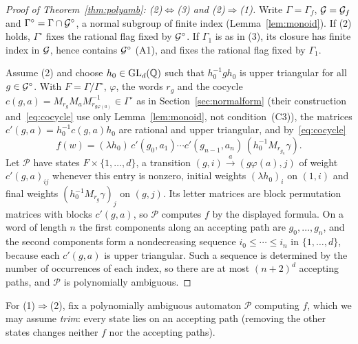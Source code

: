 \begin{proof}[Proof of Theorem~\ref{thm:polyamb}: (2)$\Leftrightarrow$(3) and (2)$\Rightarrow$(1)]
Write $\Gamma=\Gamma_f$, $\mathcal{G}=\mathcal{G}_f$ and $\Gamma^\circ=\Gamma\cap\mathcal{G}^\circ$, a normal subgroup of
finite index (Lemma~\ref{lem:monoid}). If (2) holds, $\Gamma^\circ$ fixes the rational flag fixed by
$\mathcal{G}^\circ$. If $\Gamma_1$ is as in (3), its closure has finite index in $\mathcal{G}$, hence contains
$\mathcal{G}^\circ$ (A1), and fixes the rational flag fixed by $\Gamma_1$.

Assume (2) and choose $h_0\in\mathrm{GL}_d(\mathbb{Q})$ such that $h_0^{-1}gh_0$ is upper triangular for all
$g\in\mathcal{G}^\circ$. With $F=\Gamma/\Gamma^\circ$, $\varphi$, the words $r_g$ and the cocycle
$c(g,a)=M_{r_g}M_aM_{r_{g\varphi(a)}}^{-1}\in\Gamma^\circ$ as in Section~\ref{sec:normalform} (their
construction and~\eqref{eq:cocycle} use only Lemma~\ref{lem:monoid}, not condition~(C3)), the
matrices $c'(g,a)=h_0^{-1}c(g,a)h_0$ are rational and upper triangular, and by~\eqref{eq:cocycle}
\[
f(w)=(\lambda h_0)\,c'(g_0,a_1)\cdots c'(g_{n-1},a_n)\,(h_0^{-1}M_{r_{g_n}}\gamma).
\]
Let $\mathcal P$ have states $F\times\{1,\ldots,d\}$, a transition $(g,i)\xrightarrow{a}(g\varphi(a),j)$
of weight $c'(g,a)_{ij}$ whenever this entry is nonzero, initial weights $(\lambda h_0)_i$ on $(1,i)$ and
final weights $(h_0^{-1}M_{r_g}\gamma)_j$ on $(g,j)$. Its letter matrices are block permutation matrices
with blocks $c'(g,a)$, so $\mathcal P$ computes $f$ by the displayed formula. On a word of length $n$
the first components along an accepting path are $g_0,\ldots,g_n$, and the second components form a
nondecreasing sequence $i_0\le\cdots\le i_n$ in $\{1,\ldots,d\}$, because each $c'(g,a)$ is upper
triangular. Such a sequence is determined by the number of occurrences of each index, so there are at most $(n+2)^d$ accepting paths, and $\mathcal P$ is
polynomially ambiguous.
\end{proof}

For (1)$\Rightarrow$(2), fix a polynomially ambiguous automaton $\mathcal P$ computing $f$, which we may
assume \emph{trim}: every state lies on an accepting path (removing the other states changes neither
$f$ nor the accepting paths).

